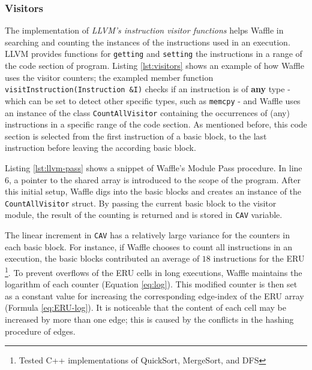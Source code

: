 \subsubsection{Visitors}

The implementation of \textit{LLVM's instruction visitor functions} \cite{inst_visitor} helps Waffle in searching and counting the instances of the instructions used in an execution. LLVM provides functions for \texttt{getting} and \texttt{setting} the instructions in a range of the code section of program. Listing \ref{lst:visitors} shows an example of how Waffle uses the visitor counters; the exampled member function \texttt{visitInstruction(Instruction \&I)} checks if an instruction is of \textbf{any} type - which can be set to detect other specific types, such as \texttt{memcpy} - and Waffle uses an instance of the class \texttt{CountAllVisitor} containing the occurrences of (any) instructions in a specific range of the code section. As mentioned before, this code section is selected from the first instruction of a basic block, to the last instruction before leaving the according basic block.




Listing \ref{lst:llvm-pass} shows a snippet of Waffle's Module Pass procedure. In line 6, a pointer to the shared array is introduced to the scope of the program. After this initial setup, Waffle digs into the basic blocks and creates an instance of the \texttt{CountAllVisitor} struct. By passing the current basic block to the visitor module, the result of the counting is returned and is stored in \texttt{CAV} variable.




The linear increment in \texttt{CAV} has a relatively large variance for the counters in each basic block. For instance, if Waffle chooses to count all instructions in an execution, the basic blocks contributed an average of $18$ instructions for the ERU \footnote{Tested C++ implementations of QuickSort, MergeSort, and DFS}. To prevent overflows of the ERU cells in long executions, Waffle maintains the logarithm of each counter (Equation \ref{eq:log}). This modified counter is then set as a constant value for increasing the corresponding edge-index of the ERU array (Formula \ref{eq:ERU-log}). It is noticeable that the content of each cell may be increased by more than one edge; this is caused by the conflicts in the hashing procedure of edges.

